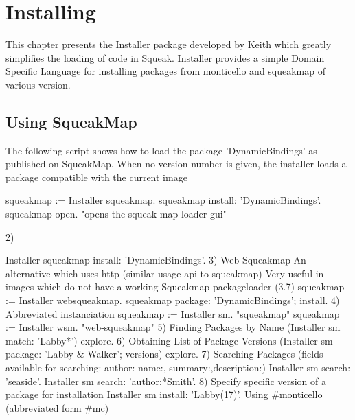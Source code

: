 \documentclass[a4paper,10pt,twoside]{book}
\begin{document}
\fi
\sloppy
\chapter{Installing }\label{cha:basic}

This chapter presents the Installer package developed by Keith which greatly simplifies the loading of code in Squeak. 
Installer provides a simple Domain Specific Language for installing packages from monticello and squeakmap of various version.


\section{Using SqueakMap}


The following script shows how to load the package 'DynamicBindings' as published on SqueakMap.
When no version number is given, the installer loads a package compatible with the current image 

\begin{code}{}
squeakmap := Installer squeakmap.
squeakmap install: 'DynamicBindings'.
squeakmap open. "opens the squeak map loader gui"
\end{code}

2) 


Installer squeakmap install: 'DynamicBindings'.
3) Web Squeakmap
An alternative which uses http (similar usage api to squeakmap)
Very useful in images which do not have a working Squeakmap packageloader (3.7)
squeakmap := Installer websqueakmap.
squeakmap package: 'DynamicBindings'; install.
4) Abbreviated instanciation
squeakmap := Installer sm. "squeakmap"
squeakmap := Installer wsm. "web-squeakmap"
5) Finding Packages by Name
(Installer sm match: 'Labby*') explore.
6) Obtaining List of Package Versions
(Installer sm package: 'Labby & Walker'; versions) explore. 
7) Searching Packages
(fields available for searching: author: name:, summary:,description:)
Installer sm search: 'seaside'.
Installer sm search: 'author:*Smith'. 
8) Specify specific version of a package for installation
Installer sm install: 'Labby(17)'.
Using #monticello (abbreviated form #mc)
\end{document}
